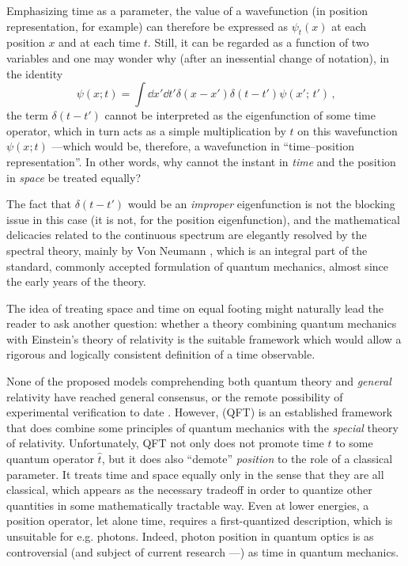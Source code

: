 Emphasizing time as a parameter, the value of a wavefunction
(in position representation, for example)
can therefore be expressed as $\psi_{t}(x)$ at each position $x$
and at each time $t$.
Still, it can be regarded as a function of two variables
and one may wonder why (after an inessential change of notation),
in the identity
\begin{equation}\label{eq:diracdeltaxt}
  \psi(x; t) = \int \dd{x'}\dd{t'} \delta(x-x')\delta(t-t') \psi(x';\, t') \,\text{,}
\end{equation}
the term $\delta(t-t')$ cannot be interpreted as the eigenfunction of some time operator,
which in turn acts as a simple multiplication by $t$ on this
wavefunction $\psi(x; t)$ ---which would be, therefore, a wavefunction in ``time--position representation''.
In other words, why cannot the instant in \emph{time}
and the position in \emph{space}
be treated equally?

The fact that $\delta(t-t')$ would be an \emph{improper} eigenfunction
is not the blocking issue in this case (it is not, for the position eigenfunction),
and the mathematical delicacies related to the continuous spectrum are
elegantly resolved by the spectral theory, mainly by Von Neumann
\parencite{VonNeumann}, which is an integral part of the standard, commonly accepted
formulation of quantum mechanics, almost since the early years of the theory.

The idea of treating space and time on equal footing might naturally lead the reader to
ask another question: whether a theory combining quantum mechanics with Einstein's
theory of relativity is the suitable framework which would allow a rigorous and logically consistent
definition of a time observable.

None of the proposed models comprehending both quantum theory and \emph{general} relativity
have reached general consensus,
or the remote possibility of experimental verification to date \parencite{QGravIntro}.
However,  (QFT) is an established framework that does combine
some principles
of quantum mechanics with the \emph{special} theory of relativity.
Unfortunately, QFT not only does not promote time $t$ to some quantum operator $\hat{t}$,
but it does also ``demote'' \emph{position} to the role of a classical parameter.
It treats time and space equally only in the sense that they are all classical,
which appears as the necessary tradeoff in order to quantize other quantities
in some mathematically tractable way. Even at lower energies,
a position operator, let alone time, requires a first-quantized description,
which is unsuitable for e.g. photons.
Indeed, photon position in quantum optics is as controversial
(and subject of current research ---\cite{HawtonPhotonPosition, Hawton2019})
as time in quantum mechanics.
